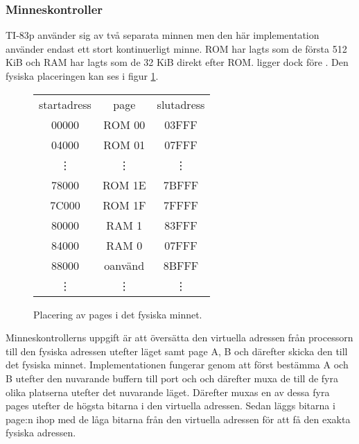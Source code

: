 \documentclass[main.tex]{subfiles}
\begin{document}
\subsubsection{Minneskontroller}
\label{sec:mmap}
TI-83p använder sig av två separata minnen men den här implementation använder
endast ett stort kontinuerligt minne. ROM har lagts som de första 512 KiB och
RAM har lagts som de 32 KiB direkt efter ROM.  ligger dock före
. Den fysiska placeringen kan ses i figur \ref{fig:physical}.
\begin{figure}[H]
    \center
    \small\ttfamily\arraybackslash
    \begin{tabular}{c|c|c}
        \multicolumn{1}{c}{\normalfont startadress} &
        \multicolumn{1}{c}{\normalfont page} &
        \multicolumn{1}{c}{\normalfont slutadress} \\ \cline{2-2}
        00000  & ROM 00  & 03FFF \\ \cline{2-2}
        04000  & ROM 01  & 07FFF \\
        \multicolumn{1}{c}{\vdots} &
        \multicolumn{1}{c}{\vdots} & \vdots \\
        78000  & ROM 1E  & 7BFFF \\ \cline{2-2}
        7C000  & ROM 1F  & 7FFFF \\ \cline{2-2}
        80000  & RAM 1   & 83FFF \\ \cline{2-2}
        84000  & RAM 0   & 07FFF \\ \cline{2-2}
        88000  & oanvänd & 8BFFF \\ \cline{2-2}
        \vdots & \vdots  & \vdots \\
    \end{tabular}
    \caption{Placering av pages i det fysiska minnet.}
    \label{fig:physical}
\end{figure}
Minneskontrollerns uppgift är att översätta den virtuella adressen från
processorn till den fysiska adressen utefter läget samt page A, B och därefter
skicka den till det fysiska minnet. Implementationen fungerar genom att först
bestämma A och B utefter den nuvarande buffern till port  och
 och därefter muxa de till de fyra olika platserna utefter det
nuvarande läget. Därefter muxas en av dessa fyra pages utefter de högsta
bitarna i den virtuella adressen. Sedan läggs bitarna i page:n ihop med de låga
bitarna från den virtuella adressen för att få den exakta fysiska adressen.
\end{document}
